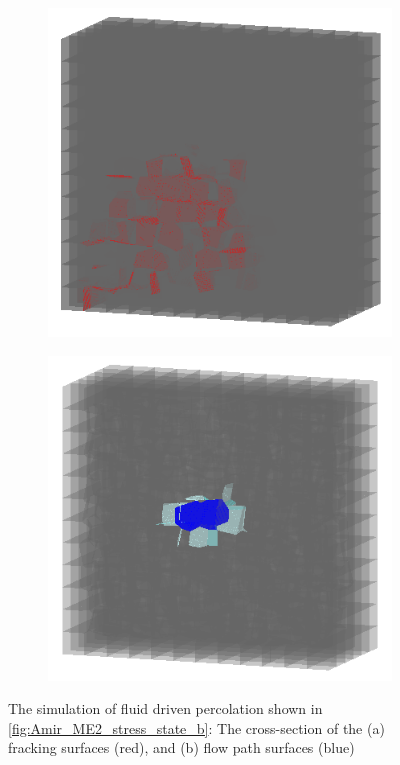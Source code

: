 \begin{figure}[!ht]
\begin{subfigure}[c]{0.48\textwidth}
\includegraphics[width=1\textwidth]{figures/Amir_ME2_LEM_b_model_Fracture.png}
\subcaption{}
\label{fig:Amir_ME2_LEM_b_model_Fracture}
\end{subfigure}
\hfill
\begin{subfigure}[c]{0.48\textwidth}
\includegraphics[width=1\textwidth]{figures/Amir_ME2_LEM_b_model_Flow.png}
\subcaption{}
\label{fig:Amir_ME2_LEM_b_model_Flow}
\end{subfigure}
\caption{ The simulation of fluid driven percolation shown in \ref{fig:Amir_ME2_stress_state_b}: The cross-section of the (a) fracking surfaces (red), and (b) flow path surfaces (blue)}
\end{figure}
